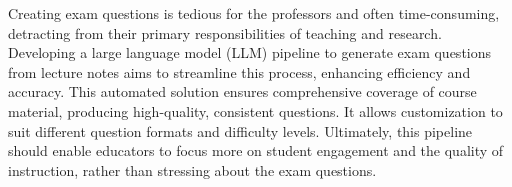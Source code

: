

{
   Creating exam questions is tedious for the professors and often time-consuming, detracting from their primary responsibilities of teaching and research. Developing a large language model (LLM) pipeline to generate exam questions from lecture notes aims to streamline this process, enhancing efficiency and accuracy. This automated solution ensures comprehensive coverage of course material, producing high-quality, consistent questions. It allows customization to suit different question formats and difficulty levels. Ultimately, this pipeline should enable educators to focus more on student engagement and the quality of instruction, rather than stressing about the exam questions.
}

